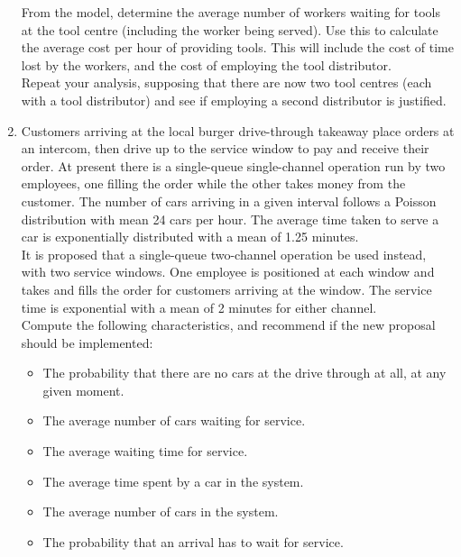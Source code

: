 \documentclass[12pt]{article}
\begin{document}
\begin{enumerate}
From the model, determine the average number of workers waiting for tools at the tool centre (including the worker being served). Use this to calculate the average cost per hour of providing tools. This will include the cost of time lost by the workers, and the cost of employing the tool distributor.\\

Repeat your analysis, supposing that there are now two tool centres (each with a tool distributor) and see if employing a second distributor is justified.

\item Customers arriving at the local burger drive-through takeaway place orders at an intercom, then drive up to the service window to pay and receive their order. At present there is a single-queue single-channel operation run by two employees, one filling the order while the other takes money from the customer. The number of cars arriving in a given interval follows a Poisson distribution with mean 24 cars per hour. The average time taken to serve a car is exponentially distributed with a mean of 1.25 minutes.\\

    It is proposed that a single-queue two-channel operation be used instead, with two service windows. One employee is positioned at each window and takes and fills the order for customers arriving at the window. The service time is exponential with a mean of 2 minutes for either channel.\\

    Compute the following characteristics, and recommend if the new proposal should be implemented:
    \begin{itemize}
    \item The probability that there are no cars at the drive through at all, at any given moment.
    \item The average number of cars waiting for service.
    \item The average waiting time for service.
    \item The average time spent by a car in the system.
    \item The average number of cars in the system.
    \item The probability that an arrival has to wait for service.
    \end{itemize}
\end{enumerate}
\end{document}

